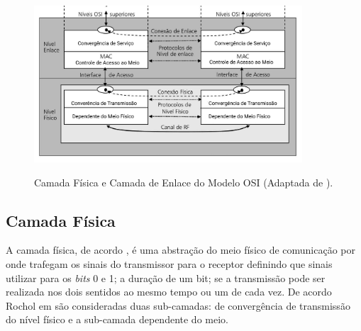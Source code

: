\begin{figure}[ht]
      \begin{center}
            \includegraphics[width=10cm]{./sections/textual/chapters/images/modelo_osi_1e2.png}\\
            \caption{Camada Física e Camada de Enlace do Modelo OSI (Adaptada de \cite{rochol2018sistemas}).}
            \label{fig:modelo_osi_1e2}
      \end{center}
\end{figure}


\subsection{Camada Física}
A camada física, de acordo \cite{tanembaum2011}, é uma abstração do meio físico de comunicação por onde trafegam os sinais do transmissor para o receptor definindo que sinais utilizar para os \emph{bits} 0 e 1; a duração de um bit; se a transmissão pode ser realizada nos dois sentidos ao mesmo tempo ou um de cada vez. De acordo Rochol em \cite{rochol2018sistemas} são consideradas duas sub-camadas: de convergência de transmissão do nível físico e a sub-camada dependente do meio.

